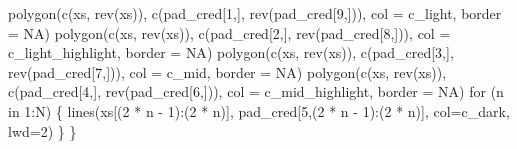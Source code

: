 \documentclass[
  letterpaper,
  DIV=11,
  numbers=noendperiod]{scrartcl}
\newenvironment{Shaded}{\begin{snugshade}}{\end{snugshade}}
\newcommand{\AttributeTok}[1]{\textcolor[rgb]{0.40,0.45,0.13}{#1}}
\newcommand{\ConstantTok}[1]{\textcolor[rgb]{0.56,0.35,0.01}{#1}}
\newcommand{\ControlFlowTok}[1]{\textcolor[rgb]{0.00,0.23,0.31}{#1}}
\newcommand{\DecValTok}[1]{\textcolor[rgb]{0.68,0.00,0.00}{#1}}
\newcommand{\FunctionTok}[1]{\textcolor[rgb]{0.28,0.35,0.67}{#1}}
\newcommand{\NormalTok}[1]{\textcolor[rgb]{0.00,0.23,0.31}{#1}}
\newcommand{\OtherTok}[1]{\textcolor[rgb]{0.00,0.23,0.31}{#1}}
\newcommand{\SpecialCharTok}[1]{\textcolor[rgb]{0.37,0.37,0.37}{#1}}
\newcommand{\StringTok}[1]{\textcolor[rgb]{0.13,0.47,0.30}{#1}}
\begin{document}
\begin{Shaded}
\begin{Highlighting}[]
  \FunctionTok{polygon}\NormalTok{(}\FunctionTok{c}\NormalTok{(xs, }\FunctionTok{rev}\NormalTok{(xs)), }\FunctionTok{c}\NormalTok{(pad\_cred[}\DecValTok{1}\NormalTok{,], }\FunctionTok{rev}\NormalTok{(pad\_cred[}\DecValTok{9}\NormalTok{,])),}
          \AttributeTok{col =}\NormalTok{ c\_light, }\AttributeTok{border =} \ConstantTok{NA}\NormalTok{)}
  \FunctionTok{polygon}\NormalTok{(}\FunctionTok{c}\NormalTok{(xs, }\FunctionTok{rev}\NormalTok{(xs)), }\FunctionTok{c}\NormalTok{(pad\_cred[}\DecValTok{2}\NormalTok{,], }\FunctionTok{rev}\NormalTok{(pad\_cred[}\DecValTok{8}\NormalTok{,])),}
          \AttributeTok{col =}\NormalTok{ c\_light\_highlight, }\AttributeTok{border =} \ConstantTok{NA}\NormalTok{)}
  \FunctionTok{polygon}\NormalTok{(}\FunctionTok{c}\NormalTok{(xs, }\FunctionTok{rev}\NormalTok{(xs)), }\FunctionTok{c}\NormalTok{(pad\_cred[}\DecValTok{3}\NormalTok{,], }\FunctionTok{rev}\NormalTok{(pad\_cred[}\DecValTok{7}\NormalTok{,])),}
          \AttributeTok{col =}\NormalTok{ c\_mid, }\AttributeTok{border =} \ConstantTok{NA}\NormalTok{)}
  \FunctionTok{polygon}\NormalTok{(}\FunctionTok{c}\NormalTok{(xs, }\FunctionTok{rev}\NormalTok{(xs)), }\FunctionTok{c}\NormalTok{(pad\_cred[}\DecValTok{4}\NormalTok{,], }\FunctionTok{rev}\NormalTok{(pad\_cred[}\DecValTok{6}\NormalTok{,])),}
          \AttributeTok{col =}\NormalTok{ c\_mid\_highlight, }\AttributeTok{border =} \ConstantTok{NA}\NormalTok{)}
  \ControlFlowTok{for}\NormalTok{ (n }\ControlFlowTok{in} \DecValTok{1}\SpecialCharTok{:}\NormalTok{N) \{}
    \FunctionTok{lines}\NormalTok{(xs[(}\DecValTok{2} \SpecialCharTok{*}\NormalTok{ n }\SpecialCharTok{{-}} \DecValTok{1}\NormalTok{)}\SpecialCharTok{:}\NormalTok{(}\DecValTok{2} \SpecialCharTok{*}\NormalTok{ n)], pad\_cred[}\DecValTok{5}\NormalTok{,(}\DecValTok{2} \SpecialCharTok{*}\NormalTok{ n }\SpecialCharTok{{-}} \DecValTok{1}\NormalTok{)}\SpecialCharTok{:}\NormalTok{(}\DecValTok{2} \SpecialCharTok{*}\NormalTok{ n)],}
          \AttributeTok{col=}\NormalTok{c\_dark, }\AttributeTok{lwd=}\DecValTok{2}\NormalTok{)}
\NormalTok{  \}}
\NormalTok{\}}
\end{Highlighting}
\end{Shaded}

\begin{Shaded}
\end{Shaded}
\end{document}
